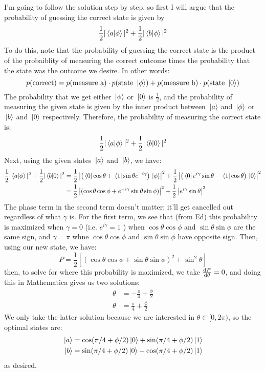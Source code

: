 \documentclass[10pt]{article}
\begin{document}
	 \begin{solution}
		I'm going to follow the solution step by step, so first I will argue that the probability of guessing the 
		correct state is given by 
		\[
		\frac{1}{2}|\braket*{a}{\phi}|^2 + \frac{1}{2}|\braket*{b}{\phi}|^2
		\] 
		To do this, note that the probability of guessing the correct state is the product of the probaiblity of 
		measuring the correct outcome times the probability that the state was the outcome we desire. In other 
		words:
		\[
			p(\text{correct}) = p(\text{measure a}) \cdot p(\text{state \( \ket*{\phi} \)}) + p(\text{measure b}) \cdot 
		p(\text{state \( \ket*{0} \)})
		\] 
		The probability that we get either \( \ket*{\phi} \) or \( \ket*{0} \) is \( \frac{1}{2} \), and the probability
		of measuring the given state is given by the inner product between \( \ket*{a} \) and \( \ket*{\phi} \) or 
		\( \ket*{b} \) and \( \ket*{0} \) respectively. Therefore, the probability of measuring the correct state 
		is: 
		\[
		\frac{1}{2}|\braket*{a}{\phi}|^2 + \frac{1}{2}|\braket*{b}{0}|^2
		\] 
		Next, using the given states \( \ket*{a} \) and \( \ket*{b} \), we have:
		\begin{align*}
			\frac{1}{2}|\braket*{a}{\phi}|^2 + \frac{1}{2}|\braket*{b}{0}|^2 &= 
			\frac{1}{2}\left|\left(\bra*{0}\cos \theta 
			+ \bra*{1} \sin \theta e^{-i \gamma}\right) \ket*{\phi}\right|^2 + \frac{1}{2}\left| 
			\left(\bra*{0} e^{i \gamma }\sin \theta - \bra*{1}\cos \theta\right) \ket*{0}\right| ^2\\
			&= \frac{1}{2}\left| (\cos \theta \cos \phi + e^{-i \gamma} \sin \theta \sin \phi) \right|^2
			+ \frac{1}{2}\left| e^{i \gamma}\sin \theta \right|^2 
		\end{align*}
		The phase term in the second term doesn't matter; it'll get cancelled out regardless of what 
		\( \gamma \) is. For the first term, we see that (from Ed) this probability is maximized when 
		\( \gamma = 0 \) (i.e. \( e^{i \gamma} = 1 \) ) when \( \cos \theta \cos \phi \) and 
		\( \sin \theta \sin \phi \) are the same sign, and \( \gamma = \pi \) whne \( \cos \theta \cos \phi \) 
		and \( \sin \theta \sin \phi \) have opposite sign. Then, using our new state, we have:
		\[
			P = \frac{1}{2}\left[(\cos \theta \cos \phi + \sin \theta \sin \phi)^2 + \sin^2 \theta\right]
		\] 
		then, to solve for where this probability is maximized, we take \( \dv{P}{\theta} = 0 \), and doing this 
		in Mathematica gives us two solutions:
		\begin{align*}
			\theta &= -\frac{\pi}{4} + \frac{\phi}{2}\\
			\theta &=  \frac{\pi}{4} + \frac{\phi}{2} 
		\end{align*}
		We only take the latter solution because we are interested in \( \theta \in [0, 2\pi) \), so the optimal 
		states are:
		\begin{align*}
			\ket*{a} &= \cos(\pi /4 + \phi / 2) \ket*{0}+ \sin(\pi /4 + \phi /2) \ket*{1} \\
		 \ket*{b} &= \sin(\pi /4 + \phi / 2) \ket*{0} - \cos(\pi /4 + \phi /2) \ket*{1} 
		\end{align*}
		as desired. 
	 \end{solution}
	 \pagebreak
\end{document}

